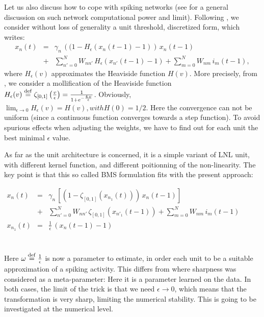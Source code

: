 Let us also discuss how to cope with spiking networks (see \cite{cessac-paugam-moisy-etal:10} for a general discussion on such network computational power and limit).
 Following \cite{cessac_discrete_2008}, we consider without loss of generality a unit threshold, discretized form, which writes: \begin{equation}\label{lif-network} \begin{array}{rcl}x_n(t) &=& \gamma_n \, \left((1 - H_\epsilon\left(x_n(t-1) - 1\right)\right) \,x_n(t-1) \\ &+& \sum_{n' = 0}^{N} W_{nn'} \, H_\epsilon\left(x_{n'}(t-1) - 1\right) + \sum_{m = 0}^{N} W_{nm} \, i_m(t-1), \end{array}\end{equation} 
where $H_\epsilon(v)$ approximates the Heaviside function $H(v)$. More precisely, from \cite{cessac_using_2012}, we consider a mollification of the Heaviside function $H_\epsilon(v) \stackrel {\rm def}{=} \zeta_{[0,1]}\left(\frac{v}{\epsilon}\right) = \frac{1}{1+e^{-\frac{4\,v}{\epsilon}}}$. Obviously, $\lim_{\epsilon \rightarrow 0} H_\epsilon(v) = H(v), with H(0) = 1/2$. Here the convergence can not be uniform (since a continuous function converges towards a step function). To avoid spurious effects when adjusting the weights, we have to find out for each unit the best minimal $\epsilon$ value.
 
As far as the unit architecture is concerned, it is a simple variant of LNL unit, with different kernel function, and different poitionning of the non-linearity. The key point is that this so called BMS formulation fits with the present approach:
\\\centerline{$\begin{array}{rcl}
 x_n(t) &=& \gamma_n \, \left[(1-\zeta_{[0,1]}(x_{n_1}(t))) \, x_n(t-1)\right] \\ 
  &+& \sum_{n' = 0}^{N} W_{nn'} \, \zeta_{[0,1]}\left(x_{n'_1}(t-1)\right) + 
      \sum_{m = 0}^{N} W_{nm} \, i_m(t-1) \\
 x_{n_1}(t) &=& \frac{1}{\epsilon} \, (x_n(t-1) - 1) \\
\end{array}$}\\
Here $\omega\stackrel {\rm def}{=}\frac{1}{\epsilon}$ is now a parameter to estimate, in order each unit to be a suitable approximation of a spiking activity. This differs from \cite{cessac_using_2012} where sharpness was considered as a meta-parameter: Here it is a parameter learned on the data. In both cases, the limit of the trick is that we need ${\epsilon \rightarrow 0}$, which means that the transformation is very sharp, limiting the numerical stability. This is going to be investigated at the numerical level.

